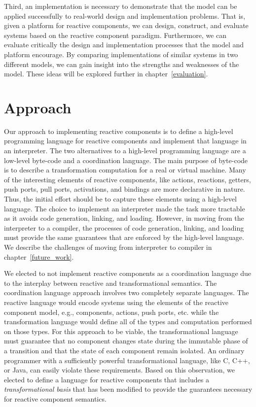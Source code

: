 Third, an implementation is necessary to demonstrate that the model can be applied successfully to real-world design and implementation problems.
That is, given a platform for reactive components, we can design, construct, and evaluate systems based on the reactive component paradigm.
Furthermore, we can evaluate critically the design and implementation processes that the model and platform encourage.
By comparing implementations of similar systems in two different models, we can gain insight into the strengths and weaknesses of the model.
These ideas will be explored further in chapter~\ref{evaluation}.

\section{Approach}
Our approach to implementing reactive components is to define a high-level programming language for reactive components and implement that language in an interpreter.
The two alternatives to a high-level programming language are a low-level byte-code and a coordination language.
The main purpose of byte-code is to describe a transformation computation for a real or virtual machine.
Many of the interesting elements of reactive components, like actions, reactions, getters, push ports, pull ports, activations, and bindings are more declarative in nature.
Thus, the initial effort should be to capture these elements using a high-level language.
The choice to implement an interpreter made the task more tractable as it avoids code generation, linking, and loading.
However, in moving from the interpreter to a compiler, the processes of code generation, linking, and loading must provide the same guarantees that are enforced by the high-level language.
We describe the challenges of moving from interpreter to compiler in chapter~\ref{future_work}.

We elected to not implement reactive components as a coordination language due to the interplay between reactive and transformational semantics.
The coordination language approach involves two completely separate languages.
The reactive language would encode systems using the elements of the reactive component model, e.g., components, actions, push ports, etc. while the transformation language would define all of the types and computation performed on those types.
For this approach to be viable, the transformational language must guarantee that no component changes state during the immutable phase of a transition and that the state of each component remain isolated.
An ordinary programmer with a sufficiently powerful transformational language, like C, C++, or Java, can easily violate these requirements.
Based on this observation, we elected to define a language for reactive components that includes a \emph{transformational basis} that has been modified to provide the guarantees necessary for reactive component semantics.

